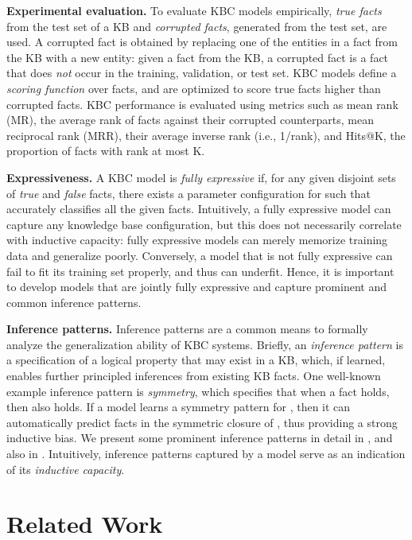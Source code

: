\documentclass{article}
\begin{document}
\textbf{Experimental evaluation.} To evaluate KBC models empirically, \emph{true facts} from the test set of a KB and \emph{corrupted facts}, generated from the test set, are used.
A corrupted fact is obtained by replacing one of the entities in a fact from the KB with a new entity: given a fact  from the KB, a corrupted fact is a fact  that does \emph{not} occur in the training, validation, or test set.
KBC models define a \emph{scoring function} over facts, and are optimized to score true facts higher than corrupted facts. KBC performance is evaluated using metrics \cite{TransE-NIPS13} such as mean rank (MR), the average rank of facts against their corrupted counterparts, mean reciprocal rank (MRR), their average inverse rank (i.e., 1/rank), and  Hits@K, the proportion of facts with rank at most K. 

\textbf{Expressiveness.} A KBC model  is  \emph{fully expressive} if, for any given disjoint sets of \emph{true} and \emph{false} facts, there exists a parameter configuration for  such that  accurately classifies all the given facts. 
Intuitively, a fully expressive model can capture any knowledge base configuration, but this does not necessarily correlate with inductive capacity: fully expressive models can merely memorize training data and generalize poorly. Conversely, a model that is not fully expressive can fail to fit its training set properly, and thus can underfit. Hence, it is important to develop models that are jointly fully expressive and capture prominent and common inference patterns.

\textbf{Inference patterns.}
Inference patterns are a common means to formally analyze the generalization ability of KBC systems. Briefly, an \emph{inference pattern} is a specification of a logical property that may exist in a KB, which, if learned, enables further principled inferences from existing KB facts.
One well-known example inference pattern is \emph{symmetry}, which specifies that when a fact  holds, then  also holds. If a model learns a symmetry pattern for , then it can automatically predict facts in the symmetric closure of , thus providing a strong inductive bias. 
We present some prominent inference patterns in detail in , and also in . Intuitively, inference patterns captured by a model serve as an indication of its \emph{inductive capacity}.

\section{Related Work}
\end{document}
